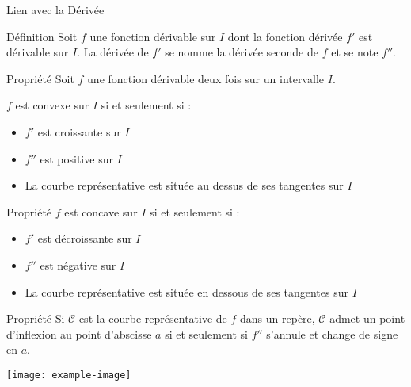 \documentclass{cours}
\begin{document}
    \begin{Gpartie}{Lien avec la Dérivée} 
        \begin{Spartie}{Définition} 
            Soit $f$ une fonction dérivable sur $I$ dont la fonction dérivée $f'$ est dérivable sur $I$. La dérivée de $f'$ se nomme la dérivée seconde de $f$ et se note $f''$.
        \end{Spartie}
        \begin{Spartie}{Propriété} 
            Soit $f$ une fonction dérivable deux fois sur un intervalle $I$.

            $f$ est convexe sur $I$ si et seulement si :
            \begin{itemize}
                \item $f'$ est croissante sur $I$
                \item $f''$ est positive sur $I$
                \item La courbe représentative est située au dessus de ses tangentes sur $I$
            \end{itemize}
        \end{Spartie}
        \begin{Spartie}{Propriété} 
            $f$ est concave sur $I$ si et seulement si :
            \begin{itemize}
                \item $f'$ est décroissante sur $I$
                \item $f''$ est négative sur $I$
                \item La courbe représentative est située en dessous de ses tangentes sur $I$
            \end{itemize}
        \end{Spartie}
        \begin{Spartie}{Propriété} 
            Si $\mathcal{C}$ est la courbe représentative de $f$ dans un repère, $\mathcal{C}$ admet un point d'inflexion au point d'abscisse $a$ si et seulement si $f''$ s'annule et change de signe en $a$.

            \begin{center}
                    \texttt{[image: example-image]}
                \parbox{\linewidth}{}
            \end{center}
        \end{Spartie}
    \end{Gpartie}
\end{document}
